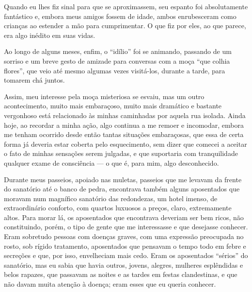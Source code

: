 

Quando eu lhes fiz sinal para que se aproximassem, seu espanto foi
absolutamente fantástico e, embora meus amigos fossem de idade, ambos
enrubesceram como crianças ao estender a mão para cumprimentar. O que
fiz por eles, ao que parece, era algo inédito em suas vidas.

Ao longo de alguns meses, enfim, o ``idílio'' foi se animando, passando
de um sorriso e um breve gesto de amizade para conversas com a moça
``que colhia flores'', que veio até mesmo algumas vezes visitá-los,
durante a tarde, para tomarem chá juntos.

Assim, meu interesse pela moça misteriosa se esvaiu, mas um outro
acontecimento, muito mais embaraçoso, muito mais dramático e bastante
vergonhoso está relacionado às minhas caminhadas por aquela rua isolada.
Ainda hoje, ao recordar a minha ação, algo continua a me remoer e
incomodar, embora me tenham ocorrido desde então tantas situações
embaraçosas, que essa de certa forma já deveria estar coberta pelo
esquecimento, sem dizer que comecei a aceitar o fato de minhas sensações
serem julgadas, e que suportaria com tranquilidade qualquer exame de
consciência --- o que é, para mim, algo desconhecido.


Durante meus passeios, apoiado nas muletas, passeios que me levavam da
frente do sanatório até o banco de pedra, encontrava também alguns
aposentados que moravam num magnífico sanatório das redondezas, um hotel
imenso, de extraordinário conforto, com quartos luxuosos a preços,
claro, extremamente altos. Para morar lá, os aposentados que encontrava
deveriam ser bem ricos, não constituindo, porém, o tipo de gente que me
interessasse e que desejasse conhecer. Eram sobretudo pessoas com
doenças graves, com uma expressão preocupada no rosto, sob rígido
tratamento, aposentados que pensavam o tempo todo em febre e secreções e
que, por isso, envelheciam mais cedo. Eram os aposentados ``sérios'' do
sanatório, mas eu sabia que havia outros, jovens, alegres, mulheres
esplêndidas e belos rapazes, que passavam as noites e as tardes em
festas clandestinas, e que não davam muita atenção à doença; eram esses
que eu queria conhecer.

